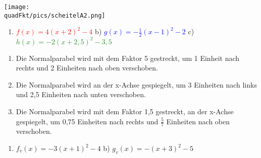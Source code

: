 \begin{Answer}[ref=scheitelformA2]

	\begin{minipage}{\linewidth}\centering
		\texttt{[image: \\quadFkt/pics/scheitelA2.png]}
	\end{minipage}\vspace{.1cm}
	\begin{enumerate}[label=\alph*)]
		\item \textcolor{red}{\(f(x)=4\left(x+2\right)^2-4\)}
		\quad b) \textcolor{blue}{\(g(x)=-\tfrac{1}{2}\left(x-1\right)^2-2\)} \quad c) \textcolor{ForestGreen}{\(h(x)=-2\left(x+2,5\right)^2-3,5\)}
	\end{enumerate}
\end{Answer}
\begin{Answer}[ref=scheitelformA3]

	\begin{enumerate}[label=\alph*)]
		\item Die Normalparabel wird mit dem Faktor 5 gestreckt, um 1 Einheit nach rechts und 2 Einheiten nach oben verschoben.
		\item Die Normalparabel wird an der x-Achse gespiegelt, um 3 Einheiten nach links und 2,5 Einheiten nach unten verschoben.
		\item Die Normalparabel wird mit dem Faktor 1,5 gestreckt, an der x-Achse gespiegelt, um 0,75 Einheiten nach rechts und \(\tfrac{5}{7}\) Einheiten nach oben verschoben.
	\end{enumerate}
\end{Answer}
\begin{Answer}[ref=scheitelformA4]

	\begin{enumerate}[label=\alph*)]
		\item \(f_v(x)=-3\left(x+1\right)^2-4\) \quad b) \(g_v(x)=-\left(x+3\right)^2-5\)
	\end{enumerate}
\end{Answer}\newpage